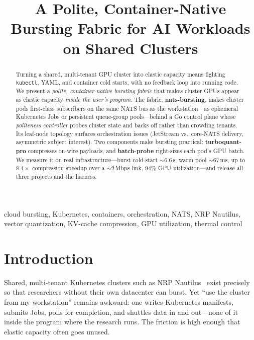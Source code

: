 \documentclass[conference]{IEEEtran}
\begin{document}
\title{A Polite, Container-Native Bursting Fabric for AI Workloads on Shared Clusters}

\author{
}

\maketitle

\begin{abstract}
Turning a shared, multi-tenant GPU cluster into elastic capacity means fighting
\texttt{kubectl}, YAML, and container cold starts, with no feedback loop into running code. We
present a \emph{polite, container-native bursting fabric} that makes cluster GPUs appear as elastic
capacity \emph{inside the user's program}. The fabric, \textbf{nats-bursting}, makes cluster pods
first-class subscribers on the same NATS bus as the workstation---as ephemeral Kubernetes Jobs or
persistent queue-group pools---behind a Go control plane whose \emph{politeness controller} probes
cluster state and backs off rather than crowding tenants. Its leaf-node topology surfaces
orchestration issues (JetStream vs.\ core-NATS delivery, asymmetric subject interest). Two
components make bursting practical: \textbf{turboquant-pro} compresses on-wire payloads, and
\textbf{batch-probe} right-sizes each pod's GPU batch. We measure it on real
infrastructure---burst cold-start $\sim$6.6\,s, warm pool $\sim$67\,ms, up to $8.4\times$
compression speedup over a $\sim$2\,Mbps link, 94\% GPU utilization---and release all three
projects and the harness.
\end{abstract}

\begin{IEEEkeywords}
cloud bursting, Kubernetes, containers, orchestration, NATS, NRP Nautilus, vector quantization,
KV-cache compression, GPU utilization, thermal control
\end{IEEEkeywords}

\section{Introduction}
Shared, multi-tenant Kubernetes clusters such as NRP Nautilus~\cite{nautilus} exist precisely so
that researchers without their own datacenter can burst. Yet ``use the cluster from my
workstation'' remains awkward: one writes Kubernetes manifests, submits Jobs, polls for
completion, and shuttles data in and out---none of it inside the program where the research runs.
The friction is high enough that elastic capacity often goes unused.
\end{document}
